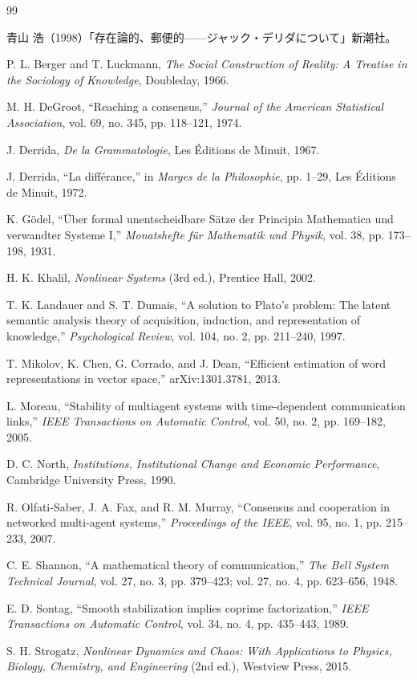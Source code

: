 \documentclass[11pt,a4paper]{article}
\theoremstyle{definition}
\begin{document}
\begin{thebibliography}{99}

 青山 浩（1998）「存在論的、郵便的——ジャック・デリダについて」新潮社。

 P. L. Berger and T. Luckmann, \textit{The Social Construction of Reality: A Treatise in the Sociology of Knowledge}, Doubleday, 1966.

 M. H. DeGroot, ``Reaching a consensus,'' \textit{Journal of the American Statistical Association}, vol. 69, no. 345, pp. 118--121, 1974.

 J. Derrida, \textit{De la Grammatologie}, Les Éditions de Minuit, 1967.

 J. Derrida, ``La différance,'' in \textit{Marges de la Philosophie}, pp. 1--29, Les Éditions de Minuit, 1972.

 K. Gödel, ``Über formal unentscheidbare Sätze der Principia Mathematica und verwandter Systeme I,'' \textit{Monatshefte für Mathematik und Physik}, vol. 38, pp. 173--198, 1931.

 H. K. Khalil, \textit{Nonlinear Systems} (3rd ed.), Prentice Hall, 2002.

 T. K. Landauer and S. T. Dumais, ``A solution to Plato's problem: The latent semantic analysis theory of acquisition, induction, and representation of knowledge,'' \textit{Psychological Review}, vol. 104, no. 2, pp. 211--240, 1997.

 T. Mikolov, K. Chen, G. Corrado, and J. Dean, ``Efficient estimation of word representations in vector space,'' arXiv:1301.3781, 2013.

 L. Moreau, ``Stability of multiagent systems with time-dependent communication links,'' \textit{IEEE Transactions on Automatic Control}, vol. 50, no. 2, pp. 169--182, 2005.

 D. C. North, \textit{Institutions, Institutional Change and Economic Performance}, Cambridge University Press, 1990.

 R. Olfati-Saber, J. A. Fax, and R. M. Murray, ``Consensus and cooperation in networked multi-agent systems,'' \textit{Proceedings of the IEEE}, vol. 95, no. 1, pp. 215--233, 2007.

 C. E. Shannon, ``A mathematical theory of communication,'' \textit{The Bell System Technical Journal}, vol. 27, no. 3, pp. 379--423; vol. 27, no. 4, pp. 623--656, 1948.

 E. D. Sontag, ``Smooth stabilization implies coprime factorization,'' \textit{IEEE Transactions on Automatic Control}, vol. 34, no. 4, pp. 435--443, 1989.

 S. H. Strogatz, \textit{Nonlinear Dynamics and Chaos: With Applications to Physics, Biology, Chemistry, and Engineering} (2nd ed.), Westview Press, 2015.

\end{thebibliography}
\end{document}
